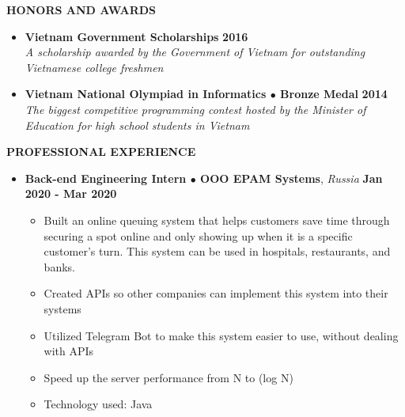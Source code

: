 \documentclass{article}
\newcommand{\cat}[1]{
	\par \noindent\ignorespaces%
	\colorbox[rgb]{0.9, 0.9, 0.9}
	{\begin{minipage}
			[c][1.2\height][c]{\linewidth}{\large\bf #1}
	\end{minipage}}%
}
\begin{document}
	\cat{HONORS AND AWARDS }
	\begin{itemize}
		\item 
		{
			\textbf{Vietnam Government Scholarships}
			\hfill
			\textbf{2016} \\
			\emph{A scholarship awarded by the Government of Vietnam for outstanding Vietnamese college freshmen}
		}
		\item 
		{
			\textbf{Vietnam National Olympiad in Informatics $\bullet$ Bronze Medal} 
			\hfill
			\textbf{2014}\\
			\emph{The biggest competitive programming contest hosted by the Minister of Education for high school students in Vietnam}
		}
	\end{itemize}
	
	
	\cat{PROFESSIONAL EXPERIENCE}
	\begin{itemize}
        \item 
		{
			\textbf{Back-end Engineering Intern $\bullet$ OOO EPAM Systems}{, \emph{Russia}}
			\hfill
			\textbf{Jan 2020 - Mar 2020} 
			\begin{itemize}%
			    \item  Built an online queuing system that helps customers save time through securing a spot online and only showing up when it is a specific customer’s turn. This system can be used in hospitals, restaurants, and banks.
			    \item Created APIs so other companies can implement this system into their systems
			    \item Utilized Telegram Bot to make this system easier to use, without dealing with APIs
                \item Speed up the server performance from N to (log N)
                \item Technology used: Java

			\end{itemize}
		}
		
	\end{itemize}
	
\end{document}
